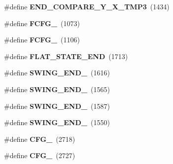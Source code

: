 \begin{DoxyCompactItemize}
\item 
\#define {\bfseries E\+N\+D\+\_\+\+C\+O\+M\+P\+A\+R\+E\+\_\+\+Y\+\_\+\+X\+\_\+\+T\+M\+P3}~(1434)\hypertarget{group___d_r_i_v_e_r_s_ga3658f219d52dff5022cc499a747ca589}{}\label{group___d_r_i_v_e_r_s_ga3658f219d52dff5022cc499a747ca589}

\item 
\#define {\bfseries F\+C\+F\+G\+\_}~(1073)\hypertarget{group___d_r_i_v_e_r_s_ga687777b4390e4a84ac774cf0600abe20}{}\label{group___d_r_i_v_e_r_s_ga687777b4390e4a84ac774cf0600abe20}

\item 
\#define {\bfseries F\+C\+F\+G\+\_}~(1106)\hypertarget{group___d_r_i_v_e_r_s_ga2ba17b85493f082e37d7e57f45200144}{}\label{group___d_r_i_v_e_r_s_ga2ba17b85493f082e37d7e57f45200144}

\item 
\#define {\bfseries F\+L\+A\+T\+\_\+\+S\+T\+A\+T\+E\+\_\+\+E\+ND}~(1713)\hypertarget{group___d_r_i_v_e_r_s_ga5c1ebd0914bd0e30766c9cbcc25c31c5}{}\label{group___d_r_i_v_e_r_s_ga5c1ebd0914bd0e30766c9cbcc25c31c5}

\item 
\#define {\bfseries S\+W\+I\+N\+G\+\_\+\+E\+N\+D\+\_}~(1616)\hypertarget{group___d_r_i_v_e_r_s_gaa6efdc55c49bd242ffafb9a9b227cca8}{}\label{group___d_r_i_v_e_r_s_gaa6efdc55c49bd242ffafb9a9b227cca8}

\item 
\#define {\bfseries S\+W\+I\+N\+G\+\_\+\+E\+N\+D\+\_}~(1565)\hypertarget{group___d_r_i_v_e_r_s_ga8a156eab56c25c1f9156a2751fa2155d}{}\label{group___d_r_i_v_e_r_s_ga8a156eab56c25c1f9156a2751fa2155d}

\item 
\#define {\bfseries S\+W\+I\+N\+G\+\_\+\+E\+N\+D\+\_}~(1587)\hypertarget{group___d_r_i_v_e_r_s_ga3ff31c1255dc1fceb7c590bc7f0b3ab0}{}\label{group___d_r_i_v_e_r_s_ga3ff31c1255dc1fceb7c590bc7f0b3ab0}

\item 
\#define {\bfseries S\+W\+I\+N\+G\+\_\+\+E\+N\+D\+\_}~(1550)\hypertarget{group___d_r_i_v_e_r_s_ga6f4579a77f23d509cd63d4506e44fa23}{}\label{group___d_r_i_v_e_r_s_ga6f4579a77f23d509cd63d4506e44fa23}

\item 
\#define {\bfseries C\+F\+G\+\_}~(2718)\hypertarget{group___d_r_i_v_e_r_s_ga3dc0e5c81e361fb871fbf63eeba82520}{}\label{group___d_r_i_v_e_r_s_ga3dc0e5c81e361fb871fbf63eeba82520}

\item 
\#define {\bfseries C\+F\+G\+\_}~(2727)\hypertarget{group___d_r_i_v_e_r_s_ga1fe6e4489855269e7197beb38b07c723}{}\label{group___d_r_i_v_e_r_s_ga1fe6e4489855269e7197beb38b07c723}


\end{DoxyCompactItemize}
